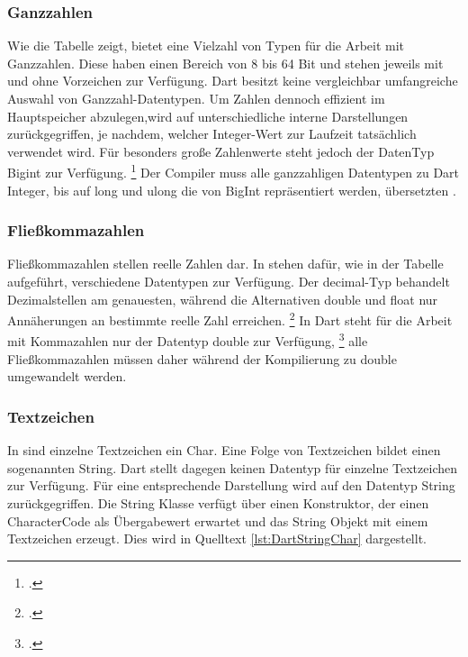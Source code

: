 \subsubsection{Ganzzahlen}
Wie die Tabelle zeigt,  bietet \Csharp{} eine Vielzahl von Typen für die Arbeit mit Ganzzahlen.  Diese haben einen Bereich von 8 bis 64 Bit und stehen jeweils mit und ohne Vorzeichen zur Verfügung.  Dart besitzt keine vergleichbar umfangreiche Auswahl von Ganzzahl-Datentypen.  Um Zahlen dennoch effizient im Hauptspeicher abzulegen,wird auf unterschiedliche interne Darstellungen zurückgegriffen,  je nachdem,  welcher Integer-Wert zur Laufzeit tatsächlich verwendet wird.  Für besonders große Zahlenwerte steht jedoch der DatenTyp \glq Bigint\grq{}  zur Verfügung.  \footcite[Vgl. ][Abgerufen am \today]{Ford2019} Der Compiler muss alle ganzzahligen  \Csharp{} Datentypen zu Dart \glq Integer\grq,  bis auf \glq long\grq{} und \glq ulong\grq{} die von \glq BigInt\grq{}  repräsentiert werden, übersetzten . 

\subsubsection{Fließkommazahlen}


Fließkommazahlen stellen reelle Zahlen dar.  In \Csharp{} stehen dafür, wie in der Tabelle aufgeführt,  verschiedene Datentypen zur Verfügung.  Der \glq decimal\grq -Typ behandelt Dezimalstellen am genauesten,  während die Alternativen \glq double\grq{} und  \glq float\grq{} nur Annäherungen an bestimmte reelle Zahl erreichen.  \footcite[Vgl. ][Abgerufen am \today]{MicrosoftFlieskomma2021}
In Dart steht für die Arbeit mit Kommazahlen nur der Datentyp \glq  double\grq{} zur Verfügung, \footcite[Vgl. ][Abgerufen am \today]{GoogleDouble} alle Fließkommazahlen müssen daher während der Kompilierung zu \glq double\grq{} umgewandelt werden.

\subsubsection{Textzeichen}

In \Csharp{} sind einzelne Textzeichen ein \glq  Char\grq .  Eine Folge von Textzeichen bildet einen  sogenannten \glq  String\grq.  Dart stellt dagegen keinen Datentyp für einzelne Textzeichen zur Verfügung.  Für eine entsprechende Darstellung wird auf den Datentyp \glq  String\grq{} zurückgegriffen.  Die  \glq String\grq{} Klasse verfügt über einen Konstruktor, der einen \glq CharacterCode\grq{} als Übergabewert erwartet und das String Objekt mit einem  Textzeichen erzeugt. Dies wird in Quelltext \ref{lst:DartStringChar} dargestellt.



